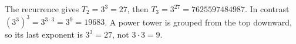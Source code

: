 The recurrence gives $T_2=3^3=27$, then $T_3=3^{27}=\boxed{7625597484987}$. In contrast $(3^3)^3=3^{3\cdot3}=3^9=19683$. A power tower is grouped from the top downward, so its last exponent is $3^3=27$, not $3\cdot3=9$.
